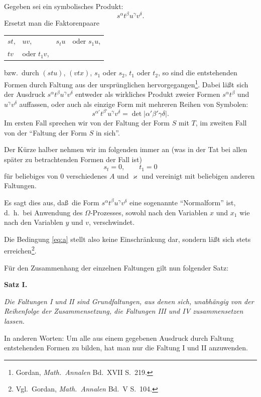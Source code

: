 \documentclass[11pt,a4paper]{article}
\theoremstyle{plain}
\theoremstyle{definition}
\begin{document}
Gegeben sei ein symbolisches Produkt:
\[
s^\alpha t^\beta u^\gamma v^\delta.
\]
Ersetzt man die Faktorenpaare
\begin{center}
\begin{tabular}{llll}
$st$, & $uv$, & $s_t u$ & oder \quad $s_1 u$, \\
$t v$ & oder \quad $t_1 v$, &
\end{tabular}
\end{center}
bzw.~durch $(stu)$, $(vtx)$, $s_1$ oder $s_2$, $t_1$ oder $t_2$,
so sind die entstehenden Formen durch Faltung aus der urspr\"unglichen hervorgegangen\footnote{Gordan, \textit{Math.~Annalen} Bd.~XVII S.~219.}. Dabei l\"a\ss t sich der Ausdruck $s^\alpha t^\beta u^\gamma v^\delta$ entweder als wirkliches Produkt zweier Formen $s^\alpha t^\beta$ und $u^\gamma v^\delta$ auffassen, oder auch als einzige Form mit mehreren Reihen von Symbolen:
\[
s^{\alpha'} t^{\beta'} u^\gamma v^\delta = \det |\alpha' \beta' \gamma \delta|.
\]
Im ersten Fall sprechen wir von der Faltung der Form $S$ mit $T$, im zweiten Fall von der ``Faltung der Form $S$ in sich''.

Der K\"urze halber nehmen wir im folgenden immer an (was in der Tat bei allen sp\"ater zu betrachtenden Formen der Fall ist)
\begin{equation}\label{eq:a}
s_t = 0, \qquad t_1 = 0
\end{equation}
f\"ur beliebiges von $0$ verschiedenes $A$ und $\varkappa$ und vereinigt mit beliebigen anderen Faltungen.

Es sagt dies aus, da\ss\ die Form $s^\alpha t^\beta u^\gamma v^\delta$ eine sogenannte ``Normalform'' ist, d.~h.~bei Anwendung des $\Omega$-Prozesses, sowohl nach den Variablen $x$ und $x_1$ wie nach den Variablen $y$ und $v$, verschwindet.

Die Bedingung \eqref{eq:a} stellt also keine Einschr\"ankung dar, sondern l\"a\ss t sich stets erreichen\footnote{Vgl.~Gordan, \textit{Math.~Annalen} Bd.~V S.~104.}.

\clearpage


F\"ur den Zusammenhang der einzelnen Faltungen gilt nun folgender Satz:

\begin{center}
\textbf{Satz I.}
\end{center}
\textit{Die Faltungen I und II sind Grundfaltungen, aus denen sich, unabh\"angig von der Reihenfolge der Zusammensetzung, die Faltungen III und IV zusammensetzen lassen.}

In anderen Worten: Um alle aus einem gegebenen Ausdruck durch Faltung entstehenden Formen zu bilden, hat man nur die Faltung I und II anzuwenden.
\end{document}
